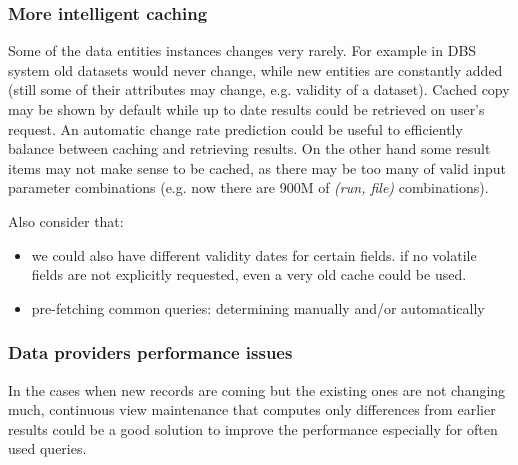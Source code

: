 \subsubsection*{More intelligent caching}
Some of the data entities instances changes very rarely. For example in DBS system old datasets would never change, while new entities are constantly added (still some of their attributes may change, e.g.  validity of a dataset). 
%
Cached copy may be shown by default while up to date results could be retrieved on user's request. An automatic change rate prediction could be useful to efficiently balance between caching and retrieving results.
%
On the other hand some result items may not make sense to be cached, as there may be too many of valid input parameter combinations (e.g. now there are 900M of \textit{(run, file)} combinations).

Also consider that:
                			\begin{itemize}
                			\item we could also have different validity dates for certain fields. if no volatile fields are not explicitly requested, even a very old cache could be used. 
                			\item pre-fetching common queries: determining manually and/or automatically
                			\end{itemize}





\subsubsection*{Data providers performance issues}
In the cases when new records are coming but the existing ones are not changing much, continuous view maintenance that computes only differences from earlier results could be a good solution to improve the performance especially for often used queries. 

